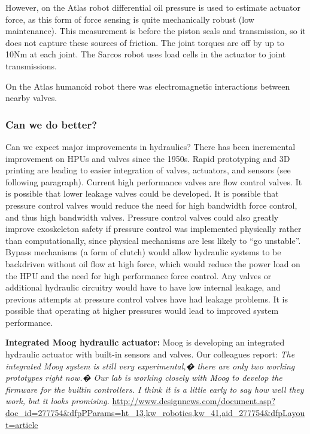\documentclass[letterpaper,12pt,fullpage]{article}
\begin{document}
However, on the Atlas robot differential oil pressure is used
to estimate actuator force, as this form of force sensing
is quite mechanically robust (low maintenance).
This measurement is before the piston
seals and transmission, so it does not capture these sources
of friction. The joint torques are off by up to 10Nm at each joint.
The Sarcos robot uses load cells in the actuator to joint transmissions.

On the Atlas humanoid robot there was electromagnetic interactions between
nearby valves.

\subsubsection{Can we do better?}

Can we expect major improvements in hydraulics?
There has been incremental improvement on HPUs and valves since
the 1950s. Rapid prototyping and 3D printing are leading to
easier integration of valves, actuators, and sensors (see following
paragraph). Current high performance valves are flow control valves. It
is possible that lower leakage valves could be developed. It is possible
that pressure control valves would reduce the need for high bandwidth
force control, and thus high bandwidth valves. Pressure control valves
could also greatly improve exoskeleton safety if pressure control was
implemented physically rather than computationally, since physical
mechanisms are less likely to ``go unstable''.
Bypass mechanisms (a form of clutch) would allow hydraulic systems
to be backdriven without oil flow at high force, which would reduce
the power load on the HPU and the need for high performance force control.
Any valves or additional hydraulic circuitry
would have to have low internal leakage, and previous attempts at
pressure control valves have had leakage problems.
It is possible that operating at higher pressures would lead to improved
system performance.

{\bf Integrated Moog hydraulic actuator:}
Moog is developing an integrated hydraulic actuator with built-in
sensors and valves. Our colleagues report:
{\it The integrated Moog system is still very experimental,� there are
only two working prototypes right now.� Our lab is working closely
with Moog to develop the firmware for the builtin controllers. I
think it is a little early to say how well they work, but it looks
promising.}
\url{http://www.designnews.com/document.asp?doc_id=277754&dfpPParams=ht_13,kw_robotics,kw_41,aid_277754&dfpLayout=article}
\end{document}
